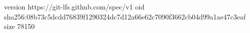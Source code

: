 version https://git-lfs.github.com/spec/v1
oid sha256:08b73c5dcdd76839f1290324dc7d12a66e62c7090f3662cb04d99a1ae47c3eaf
size 78150
